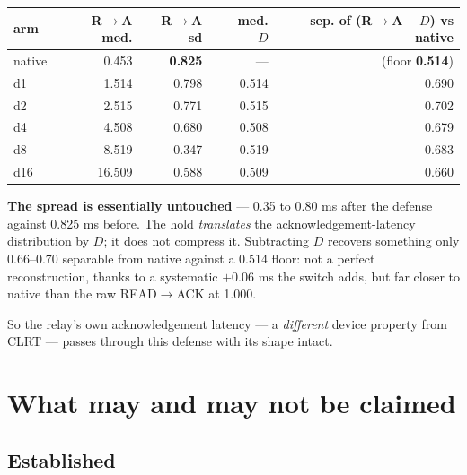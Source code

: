 \documentclass[10pt,a4paper,oneside]{article}
\newcommand{\num}[1]{\mbox{#1}}
\begin{document}
\begin{center}
\begin{tabular}{lrrrr}
\toprule
\textbf{arm} & \textbf{R$\to$A med.} & \textbf{R$\to$A sd} & \textbf{med. $-D$}
& \textbf{sep. of (R$\to$A $-\,D$) vs native} \\
\midrule
native & \num{0.453}  & \textbf{\num{0.825}} & ---          & (floor \textbf{\num{0.514}}) \\
d1     & \num{1.514}  & \num{0.798} & \num{0.514} & \num{0.690} \\
d2     & \num{2.515}  & \num{0.771} & \num{0.515} & \num{0.702} \\
d4     & \num{4.508}  & \num{0.680} & \num{0.508} & \num{0.679} \\
d8     & \num{8.519}  & \num{0.347} & \num{0.519} & \num{0.683} \\
d16    & \num{16.509} & \num{0.588} & \num{0.509} & \num{0.660} \\
\bottomrule
\end{tabular}
\end{center}

\textbf{The spread is essentially untouched} --- \num{0.35} to \num{0.80} ms after the
defense against \num{0.825} ms before. The hold \emph{translates} the acknowledgement-latency
distribution by $D$; it does not compress it. Subtracting $D$ recovers something only
\num{0.66}--\num{0.70} separable from native against a \num{0.514} floor: not a perfect
reconstruction, thanks to a systematic $+\num{0.06}$ ms the switch adds, but far closer to
native than the raw READ$\to$ACK at \num{1.000}.

So the relay's own acknowledgement latency --- a \emph{different} device property from CLRT
--- passes through this defense with its shape intact.

\section{What may and may not be claimed}
\label{sec:claims}

\subsection{Established}
\end{document}
